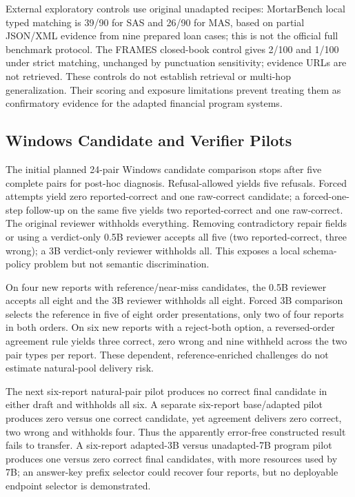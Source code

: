 \documentclass[letterpaper]{article}
\begin{document}
External exploratory controls use original unadapted recipes: MortarBench local typed matching is 39/90 for SAS and 26/90 for MAS, based on partial JSON/XML evidence from nine prepared loan cases; this is not the official full benchmark protocol. The FRAMES closed-book control gives 2/100 and 1/100 under strict matching, unchanged by punctuation sensitivity; evidence URLs are not retrieved. These controls do not establish retrieval or multi-hop generalization. Their scoring and exposure limitations prevent treating them as confirmatory evidence for the adapted financial program systems.

\subsection{Windows Candidate and Verifier Pilots}
The initial planned 24-pair Windows candidate comparison stops after five complete pairs for post-hoc diagnosis. Refusal-allowed yields five refusals. Forced attempts yield zero reported-correct and one raw-correct candidate; a forced-one-step follow-up on the same five yields two reported-correct and one raw-correct. The original reviewer withholds everything. Removing contradictory repair fields or using a verdict-only 0.5B reviewer accepts all five (two reported-correct, three wrong); a 3B verdict-only reviewer withholds all. This exposes a local schema-policy problem but not semantic discrimination.

On four new reports with reference/near-miss candidates, the 0.5B reviewer accepts all eight and the 3B reviewer withholds all eight. Forced 3B comparison selects the reference in five of eight order presentations, only two of four reports in both orders. On six new reports with a reject-both option, a reversed-order agreement rule yields three correct, zero wrong and nine withheld across the two pair types per report. These dependent, reference-enriched challenges do not estimate natural-pool delivery risk.

The next six-report natural-pair pilot produces no correct final candidate in either draft and withholds all six. A separate six-report base/adapted pilot produces zero versus one correct candidate, yet agreement delivers zero correct, two wrong and withholds four. Thus the apparently error-free constructed result fails to transfer. A six-report adapted-3B versus unadapted-7B program pilot produces one versus zero correct final candidates, with more resources used by 7B; an answer-key prefix selector could recover four reports, but no deployable endpoint selector is demonstrated.
\end{document}
